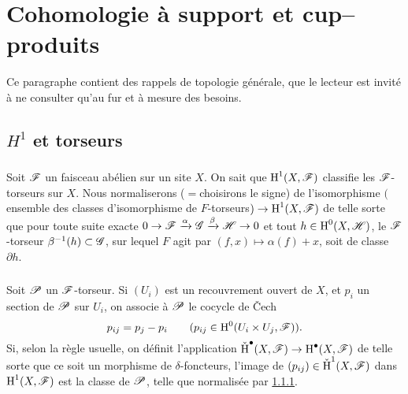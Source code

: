 \section{Cohomologie \`a support et cup--produits}\label{IV:1}

Ce paragraphe contient des rappels de topologie g\'en\'erale, que le 
lecteur est invit\'e \`a ne consulter qu'au fur et \`a mesure des besoins.










\subsection{\texorpdfstring{$H^1$}{H1} et torseurs}\label{IV:1-1}





\subsubsection{}\label{IV:1-1-1}

Soit $\mathscr{F}$ un faisceau ab\'elien sur un site $X$. On sait que $\operatorname{H}^1(X,\mathscr{F})$ 
classifie les $\mathscr{F}$-torseurs sur $X$. Nous normaliserons ($=$choisirons le 
signe) de l'isomorphisme $($ensemble des classes d'isomorphisme de 
$F$-torseurs$)\to \operatorname{H}^1(X,\mathscr{F})$ de telle sorte que pour toute suite exacte 
$0\to \mathscr{F}\xrightarrow\alpha\mathscr{G}\xrightarrow\beta\mathscr{H}\to 0$ et tout 
$h\in\operatorname{H}^0(X,\mathscr{H})$, le $\mathscr{F}$-torseur $\beta^{-1}(h)\subset \mathscr{G}$, sur lequel 
$F$ agit par $(f,x)\mapsto \alpha(f)+x$, soit de classe $\partial h$. 





\subsubsection{}\label{IV:1-1-2}

Soit $\mathscr{P}$ un $\mathscr{F}$-torseur. Si $(U_i)$ est un recouvrement ouvert de $X$, et 
$p_i$ un section de $\mathscr{P}$ sur $U_i$, on associe \`a $\mathscr{P}$ le cocycle de 
\v{C}ech
\[
  p_{i j} = p_j - p_i \qquad \text{($p_{i j}\in \operatorname{H}^0(U_i\times U_j,\mathscr{F})$).}
\]
Si, selon la r\`egle usuelle, on d\'efinit l'application 
$\operatorname{\check H}^\bullet(X,\mathscr{F})\to \operatorname{H}^\bullet(X,\mathscr{F})$ de telle sorte 
que ce soit un morphisme de $\delta$-foncteurs, l'image de 
$(p_{i j})\in \operatorname{\check H}^1(X,\mathscr{F})$ dans $\operatorname{H}^1(X,\mathscr{F})$ est la 
classe de $\mathscr{P}$, telle que normalis\'ee par \ref{IV:1-1-1}. 





